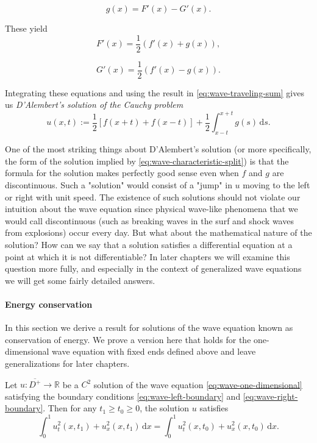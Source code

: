 \begin{equation}\label{eq:dalembert-initial-velocity-relation}
g(x)=F'(x)-G'(x).
\end{equation}


These yield
\begin{equation}\label{eq:dalembert-f-derivative}
F'(x)=\dfrac12(f'(x)+g(x)),
\end{equation}

\begin{equation}\label{eq:dalembert-g-derivative}
G'(x)=\dfrac12(f'(x)-g(x)).
\end{equation}


Integrating these equations and using the result in \eqref{eq:wave-traveling-sum} gives us \emph{D'Alembert's solution of the Cauchy problem}
\begin{equation}\label{eq:dalembert-cauchy-solution}
u(x,t):=\dfrac12[f(x+t)+f(x-t)]+\dfrac12\int_{x-t}^{x+t}g(s)\,\mathrm{d}s.
\end{equation}


One of the most striking things about D'Alembert's solution (or more specifically, the form of the solution implied by \eqref{eq:wave-characteristic-split}) is that the formula for the solution makes perfectly good sense even when $f$ and $g$ are discontinuous. Such a "solution" would consist of a "jump" in $u$ moving to the left or right with unit speed. The existence of such solutions should not violate our intuition about the wave equation since physical wave-like phenomena that we would call discontinuous (such as breaking waves in the surf and shock waves from explosions) occur every day. But what about the mathematical nature of the solution? How can we say that a solution satisfies a differential equation at a point at which it is not differentiable? In later chapters we will examine this question more fully, and especially in the context of generalized wave equations we will get some fairly detailed answers.

\paragraph*{Energy conservation}

In this section we derive a result for solutions of the wave equation known as conservation of energy. We prove a version here that holds for the one-dimensional wave equation with fixed ends defined above and leave generalizations for later chapters.

\begin{Lemma}
\label{lem:wave-energy-conservation}
Let $u:\overline{D^+}\to\mathbb{R}$ be a $C^2$ solution of the wave equation \eqref{eq:wave-one-dimensional} satisfying the boundary conditions \eqref{eq:wave-left-boundary} and \eqref{eq:wave-right-boundary}. Then for any $t_1\geq t_0\geq0$, the solution $u$ satisfies
\begin{equation}\label{eq:wave-energy-conservation}
\int_0^1u_t^2(x,t_1)+u_x^2(x,t_1)\,\mathrm{d}x=\int_0^1u_t^2(x,t_0)+u_x^2(x,t_0)\,\mathrm{d}x.
\end{equation}

\end{Lemma}

